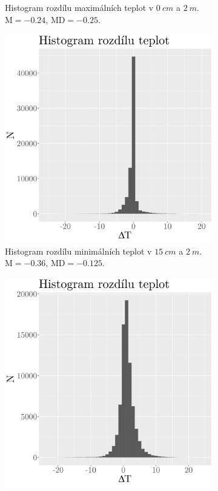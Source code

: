 \begin{figure}
\begin{subfigure}{0.45\textwidth}
		\caption{Histogram rozdílu maximálních teplot v $\SI{0}{cm}$ a $\SI{2}{m}$. $\text{M} = -0.24$, $\text{MD} = -0.25$.}
		\label{fig:hist_diff_max0cm}
	\end{subfigure}
	\hfill
	\begin{subfigure}{0.45\textwidth}
  \includegraphics[width=\textwidth]{img/ch2/hist_diff_min15cm.png}
		\caption{Histogram rozdílu minimálních teplot v $\SI{15}{cm}$ a $\SI{2}{m}$. $\text{M} = -0.36$, $\text{MD} = -0.125$.}
		\label{fig:hist_diff_min15cm}
	\end{subfigure}
	\hfill
	\begin{subfigure}{0.45\textwidth}
  \includegraphics[width=\textwidth]{img/ch2/hist_diff_min0cm.png}

\end{subfigure}
\end{figure}
